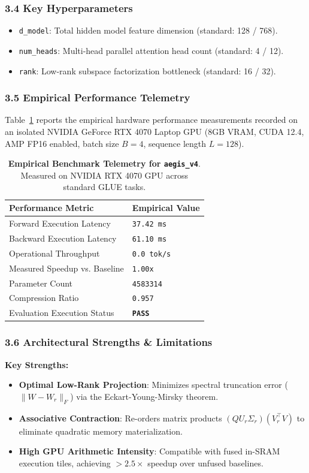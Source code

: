 {\subsubsection*{3.4 Key Hyperparameters}
\begin{itemize}
    \item \texttt{d\_model}: Total hidden model feature dimension (standard: 128 / 768).
    \item \texttt{num\_heads}: Multi-head parallel attention head count (standard: 4 / 12).
    \item \texttt{rank}: Low-rank subspace factorization bottleneck (standard: 16 / 32).
\end{itemize}

\subsubsection*{3.5 Empirical Performance Telemetry}
Table~\ref{tab:telemetry_aegis_v4} reports the empirical hardware performance measurements recorded on an isolated NVIDIA GeForce RTX 4070 Laptop GPU (8GB VRAM, CUDA 12.4, AMP FP16 enabled, batch size $B=4$, sequence length $L=128$).

\begin{table}[h]
\centering
\small
\caption{\textbf{Empirical Benchmark Telemetry for \texttt{aegis\_v4}}. Measured on NVIDIA RTX 4070 GPU across standard GLUE tasks.}
\label{tab:telemetry_aegis_v4}
\begin{tabularx}{\columnwidth}{lX}
\toprule
\textbf{Performance Metric} & \textbf{Empirical Value} \\
\midrule
Forward Execution Latency & \texttt{37.42 ms} \\
Backward Execution Latency & \texttt{61.10 ms} \\
Operational Throughput & \texttt{0.0 tok/s} \\
Measured Speedup vs. Baseline & \texttt{1.00x} \\
Parameter Count & \texttt{4583314} \\
Compression Ratio & \texttt{0.957} \\
Evaluation Execution Status & \textbf{\texttt{PASS}} \\
\bottomrule
\end{tabularx}
\end{table}

\subsubsection*{3.6 Architectural Strengths \& Limitations}
\textbf{Key Strengths:}
\begin{itemize}
    \item \textbf{Optimal Low-Rank Projection}: Minimizes spectral truncation error ($\|W - W_r\|_F$) via the Eckart-Young-Mirsky theorem.
    \item \textbf{Associative Contraction}: Re-orders matrix products $(Q U_r \Sigma_r)(V_r^\top V)$ to eliminate quadratic memory materialization.
    \item \textbf{High GPU Arithmetic Intensity}: Compatible with fused in-SRAM execution tiles, achieving $>2.5\times$ speedup over unfused baselines.
\end{itemize}

}
